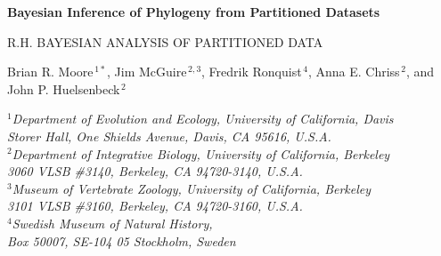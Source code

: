 \documentclass[11pt]{article}
\begin{document}


\begin{titlepage}
\begin{center}

{\Large\bf Bayesian Inference of Phylogeny from Partitioned Datasets}

\vfill

R.H. BAYESIAN ANALYSIS OF PARTITIONED DATA

\vfill

{\sc Brian R. Moore$^{\,1\ast}$, Jim McGuire$^{\,2,3}$, Fredrik Ronquist$^{\,4}$, Anna E. Chriss$^{\,2}$, and John P. Huelsenbeck$^{\,2}$} \\

\bigskip

{\em
$\mbox{}^1$Department of Evolution and Ecology, University of California, Davis\\
\vspace{-0.4\baselineskip}
Storer Hall, One Shields Avenue, Davis, CA 95616, \mbox{U.S.A.} \\

$\mbox{}^2$Department of Integrative Biology, University of California, Berkeley\\
\vspace{-0.4\baselineskip}
3060 VLSB \#3140, Berkeley, CA 94720-3140, \mbox{U.S.A.} \\

$\mbox{}^3$Museum of Vertebrate Zoology, University of California, Berkeley\\
\vspace{-0.4\baselineskip}
3101 VLSB \#3160, Berkeley, CA 94720-3160, \mbox{U.S.A.} \\

$\mbox{}^4$Swedish Museum of Natural History,\\
\vspace{-0.4\baselineskip}
Box 50007, SE-104 05 Stockholm, Sweden \\


}
\end{center}




\vfill


\end{titlepage}
\end{document}

